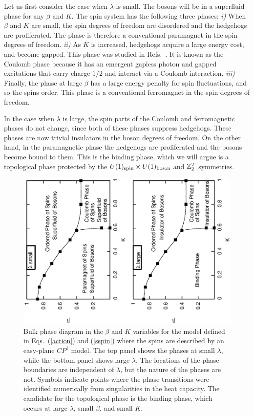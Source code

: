 Let us first consider the case when $\lambda$ is small. The bosons will be in a superfluid phase for any $\beta$ and $K$. The spin system has the following three phases: 
{\it i)} When $\beta$ and $K$ are small, the spin degrees of freedom are disordered and the hedgehogs are proliferated. The phase is therefore a conventional paramagnet in the spin degrees of freedom. 
{\it ii)} As $K$ is increased, hedgehogs acquire a large energy cost, and become gapped. This phase was studied in Refs.~\cite{LesikSenthil, LesikAshvin, artphoton}. It is known as the Coulomb phase\cite{HermeleFisherBalents} because it has an emergent gapless photon and gapped excitations that carry charge $1/2$ and interact via a Coulomb interaction. 
{\it iii)} Finally, the phase at large $\beta$ has a large energy penalty for spin fluctuations, and so the spins order. This phase is a conventional ferromagnet in the spin degrees of freedom. 

In the case when $\lambda$ is large, the spin parts of the Coulomb and ferromagnetic phases do not change, since both of these phases suppress hedgehogs. These phases are now trivial insulators in the boson degrees of freedom. On the other hand, in the paramagnetic phase the hedgehogs are proliferated and the bosons become bound to them. This is the binding phase, which we will argue is a topological phase protected by the $U(1)_{\rm spin}\times U(1)_{\rm boson}$ and $\mathbb{Z}_2^T$ symmetries.



\begin{figure}
\includegraphics[angle=-90,width=0.6\linewidth]{figures/cp1bulkphase.eps}
\caption{Bulk phase diagram in the $\beta$ and $K$ variables for the model defined in Eqs.~(\ref{action}) and (\ref{sspin}) where the spins are described by an easy-plane $CP^1$ model. The top panel shows the phases at small $\lambda$, while the bottom panel shows large $\lambda$. The locations of the phase boundaries are independent of $\lambda$, but the nature of the phases are not. Symbols indicate points where the phase transitions were identified numerically from singularities in the heat capacity. The candidate for the topological phase is the binding phase, which occurs at large $\lambda$, small $\beta$, and small $K$. }
\label{cp1bulkphase}
\end{figure}
 

